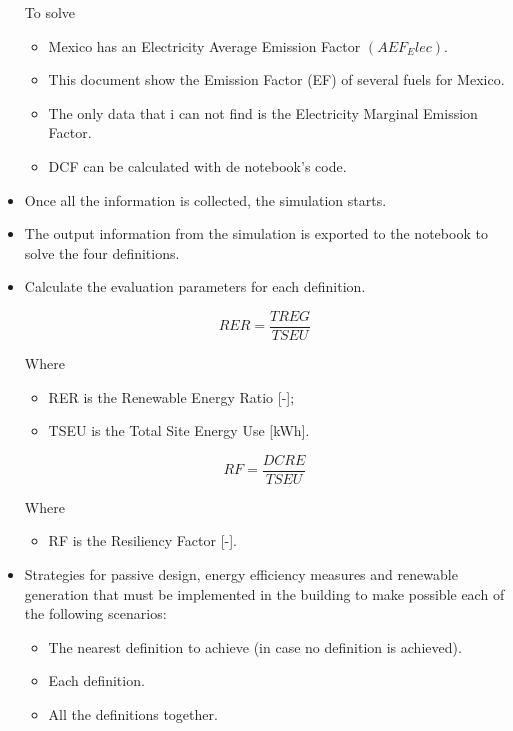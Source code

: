 \begin{enumerate*}
\begin{itemize}
To solve
\begin{itemize}
\item Mexico has an Electricity Average Emission Factor $(AEF_Elec)$.
\item This document show the  Emission Factor (EF) of several fuels for Mexico.
\item The only data that i can not find is the Electricity Marginal Emission Factor.
\item DCF can be calculated with de notebook's code.

\end{itemize}
\begin{enumerate}
\end{enumerate}
\item Once all the information is collected, the simulation starts.

\item The output information from the simulation is exported to the notebook to solve the four definitions.

\item Calculate the evaluation parameters for each definition.

\begin{equation}
RER = \frac{TREG}{TSEU}
\end{equation}

Where
\begin{itemize}
\item RER is the Renewable Energy Ratio [-]; 
\item TSEU is the Total Site Energy Use [kWh].
\end{itemize}

\begin{equation}
RF = \frac{DCRE}{TSEU}
\end{equation}

Where
\begin{itemize}
\item RF is the Resiliency Factor [-].
\end{itemize}

\item Strategies for passive design, energy efficiency measures and renewable generation that must be implemented in the building to make possible each of the following scenarios:

 \begin{itemize}
 \item The nearest definition to achieve (in case no definition is achieved).
 \item Each definition.
 \item All the definitions together.
 \end{itemize}
 

\end{itemize}
\end{enumerate*}
